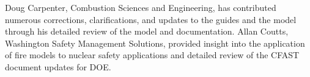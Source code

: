 \documentclass[12pt]{book}
\begin{document}
Doug Carpenter, Combustion Sciences and Engineering, has contributed numerous corrections, clarifications, and updates to the guides and the model through his detailed review of the model and documentation. Allan Coutts, Washington Safety Management Solutions, provided insight into the application of fire models to nuclear safety applications and detailed review of the CFAST document updates for DOE.


\tableofcontents

\listoffigures

\listoftables

\mainmatter









\backmatter



\end{document}
